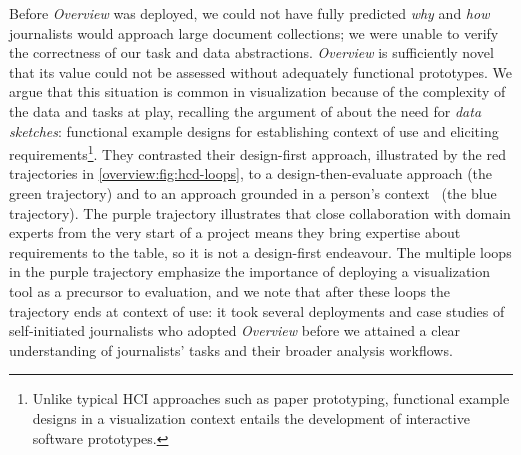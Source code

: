 Before {\it Overview} was deployed, we could not have fully predicted {\it why} and {\it how} journalists would approach large document collections; we were unable to verify the correctness of our task and data abstractions.
{\it Overview} is sufficiently novel that its value could not be assessed without adequately functional prototypes.
We argue that this situation is common in visualization because of the complexity of the data and tasks at play, recalling the argument of \citet{Lloyd2011} about the need for {\it data sketches}: functional example designs for establishing context of use and eliciting requirements\footnote{Unlike typical \ac{HCI} approaches such as paper prototyping, functional example designs in a visualization context entails the development of interactive software prototypes.}.
They contrasted their design-first approach, illustrated by the red trajectories in \autoref{overview:fig:hcd-loops}, to a design-then-evaluate approach (the green trajectory) and to an approach grounded in a person's context~\cite{Isenberg2008} (the blue trajectory).
The purple trajectory illustrates that close collaboration with domain experts from the very start of a project means they bring expertise about requirements to the table, so it is not a design-first endeavour. 
The multiple loops in the purple trajectory emphasize the importance of deploying a visualization tool as a precursor to evaluation, and we note that after these loops the trajectory ends at context of use: it took several deployments and case studies of self-initiated journalists who adopted {\it Overview} before we attained a clear understanding of journalists' tasks and their broader analysis workflows.


